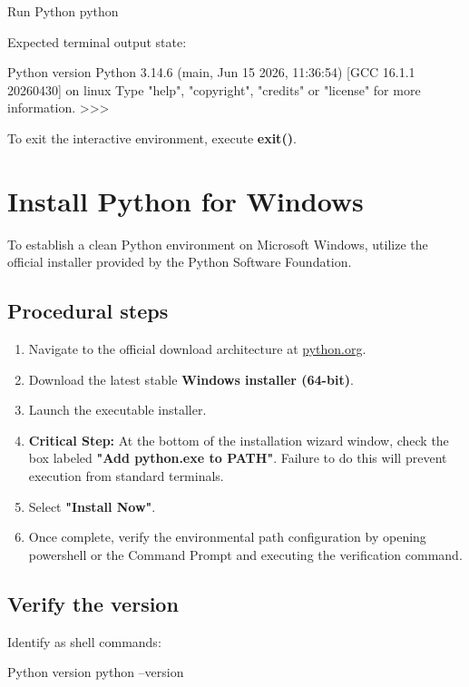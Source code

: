 \begin{zshbox}{Run Python}
python
\end{zshbox}

Expected terminal output state:
\begin{zshbox}{Python version}
Python 3.14.6 (main, Jun 15 2026, 11:36:54) [GCC 16.1.1 20260430] on linux
Type "help", "copyright", "credits" or "license" for more information.
>>>
\end{zshbox}

To exit the interactive environment, execute \textbf{exit()}.

\section{Install Python for Windows}

To establish a clean Python environment on Microsoft Windows, utilize the official installer provided by the Python Software Foundation.

\subsection{Procedural steps}
\begin{enumerate}
    \item Navigate to the official download architecture at \href{https://www.python.org/downloads/windows/}{python.org}.
    \item Download the latest stable \textbf{Windows installer (64-bit)}.
    \item Launch the executable installer.
    \item \textbf{Critical Step:} At the bottom of the installation wizard window, check the box labeled \textbf{"Add python.exe to PATH"}. Failure to do this will prevent execution from standard terminals.
    \item Select \textbf{"Install Now"}.
    \item Once complete, verify the environmental path configuration by opening \gls{powershell} or the Command Prompt and executing the verification command.
\end{enumerate}

\subsection{Verify the version}
Identify as shell commands:
\begin{zshbox}{Python version}
python --version
\end{zshbox}

